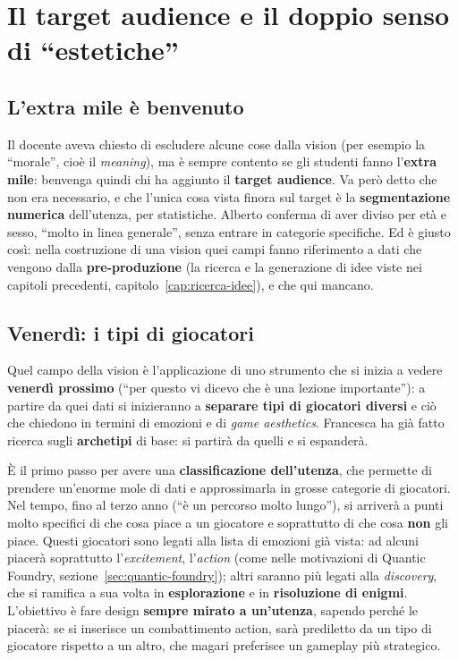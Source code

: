 \section{Il target audience e il doppio senso di ``estetiche''}
\label{gd15:sec:target}

\subsection{L'extra mile è benvenuto}

Il docente aveva chiesto di escludere alcune cose dalla vision (per esempio
la ``morale'', cioè il \emph{meaning}), ma è sempre contento se gli studenti
fanno l'\textbf{extra mile}: benvenga quindi chi ha aggiunto il
\textbf{target audience}. Va però detto che non era necessario, e che
l'unica cosa vista finora sul target è la \textbf{segmentazione numerica}
dell'utenza, per statistiche. Alberto conferma di aver diviso per età e
sesso, ``molto in linea generale'', senza entrare in categorie specifiche.
Ed è giusto così: nella costruzione di una vision quei campi fanno
riferimento a dati che vengono dalla \textbf{pre-produzione} (la ricerca e
la generazione di idee viste nei capitoli precedenti, capitolo~\ref{cap:ricerca-idee}),
e che qui mancano.

\subsection{Venerdì: i tipi di giocatori}

Quel campo della vision è l'applicazione di uno strumento che si inizia a
vedere \textbf{venerdì prossimo} (``per questo vi dicevo che è una lezione
importante''): a partire da quei dati si inizieranno a \textbf{separare tipi
di giocatori diversi} e ciò che chiedono in termini di emozioni e di
\emph{game aesthetics}. Francesca ha già fatto ricerca sugli
\textbf{archetipi} di base: si partirà da quelli e si espanderà.

È il primo passo per avere una \textbf{classificazione dell'utenza}, che
permette di prendere un'enorme mole di dati e approssimarla in grosse
categorie di giocatori. Nel tempo, fino al terzo anno (``è un percorso molto
lungo''), si arriverà a punti molto specifici di che cosa piace a un
giocatore e soprattutto di che cosa \textbf{non} gli piace. Questi giocatori
sono legati alla lista di emozioni già vista: ad alcuni piacerà soprattutto
l'\emph{excitement}, l'\emph{action} (come nelle motivazioni di Quantic
Foundry, sezione~\ref{sec:quantic-foundry}); altri saranno più legati alla
\emph{discovery}, che si ramifica a sua volta in \textbf{esplorazione} e in
\textbf{risoluzione di enigmi}. L'obiettivo è fare design \textbf{sempre
mirato a un'utenza}, sapendo perché le piacerà: se si inserisce un
combattimento action, sarà prediletto da un tipo di giocatore rispetto a un
altro, che magari preferisce un gameplay più strategico.

